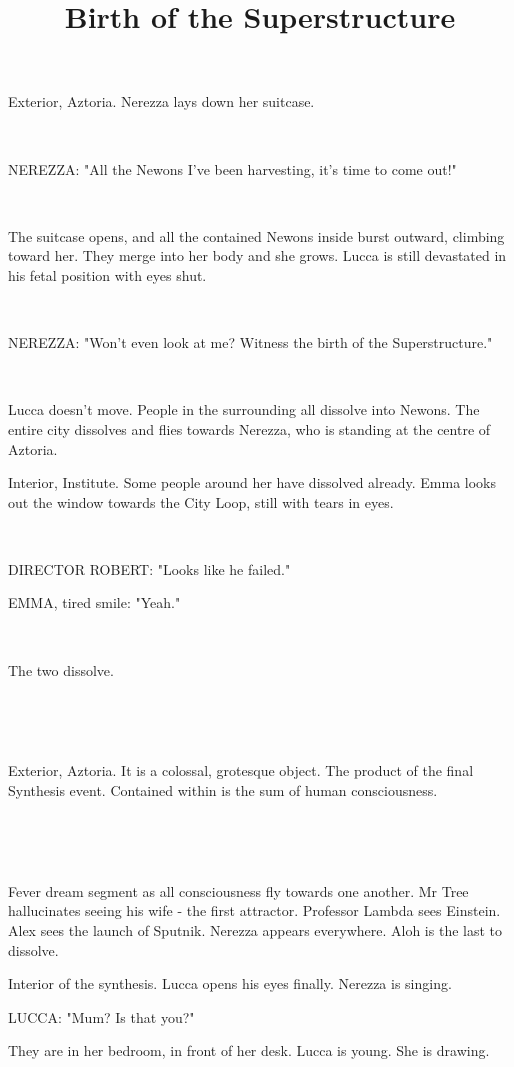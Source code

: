 \documentclass[11pt]{article}
\begin{document}
\ttfamily
\title{Birth of the Superstructure}
\maketitle


Exterior, Aztoria. 
Nerezza lays down her suitcase. 

\ 

NEREZZA: "All the Newons I've been harvesting, it's time to come out!"

\ 

The suitcase opens, and all the contained Newons inside burst outward, climbing toward her.
They merge into her body and she grows.
Lucca is still devastated in his fetal position with eyes shut.

\ 

NEREZZA: "Won't even look at me?
Witness the birth of the Superstructure."

\ 

Lucca doesn't move. 
People in the surrounding all dissolve into Newons.
The entire city dissolves and flies towards Nerezza, who is standing at the centre of Aztoria. 

Interior, Institute.
Some people around her have dissolved already.
Emma looks out the window towards the City Loop, still with tears in eyes.

\ 

DIRECTOR ROBERT: "Looks like he failed."

EMMA, tired smile: "Yeah."

\ 

The two dissolve.

\ 

\ 

Exterior, Aztoria.
It is a colossal, grotesque object.
The product of the final Synthesis event.
Contained within is the sum of human consciousness.

\ 

\ 

Fever dream segment as all consciousness fly towards one another.
Mr Tree hallucinates seeing his wife - the first attractor.
Professor Lambda sees Einstein.
Alex sees the launch of Sputnik.
Nerezza appears everywhere.
Aloh is the last to dissolve.

Interior of the synthesis. 
Lucca opens his eyes finally. 
Nerezza is singing.

LUCCA: "Mum? Is that you?"

They are in her bedroom, in front of her desk.
Lucca is young.
She is drawing. 
\end{document}
